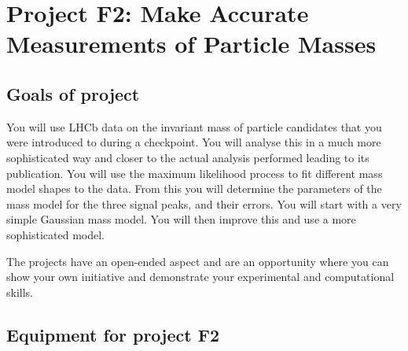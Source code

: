 \begin{enumerate}

\end{enumerate}

 
 


\newpage
\section{Project F2: Make Accurate Measurements of Particle Masses}

\subsection{Goals of project}

You will use LHCb data on the invariant mass of particle candidates that you were introduced to during a checkpoint. You will analyse this in a much more sophisticated way and closer to the actual analysis performed leading to its publication. You will use the maximum likelihood process to fit different mass model shapes to the data. From this you will determine the parameters of the mass model for the three signal peaks, and their errors. You will start with a very simple Gaussian mass model. You will then improve this and use a more sophisticated model.

The projects have an open-ended aspect and are an opportunity where you can show your own initiative and demonstrate your experimental and computational skills. 

\subsection{Equipment for project F2}

